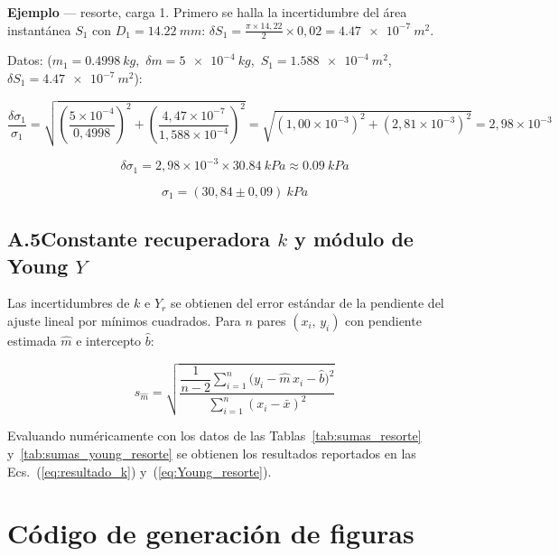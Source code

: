 \begin{appendices}
\textbf{Ejemplo} — resorte, carga 1. 
Primero se halla la incertidumbre del área instantánea $S_1$ con $D_1 = \qty{14,22}{mm}$:
$\delta S_1 = \frac{\pi \times 14{,}22}{2} \times 0{,}02 = \qty{4,47e-7}{m^2}$.

Datos: ($m_1 = \qty{0,4998}{kg}$,\ $\delta m = \qty{5e-4}{kg}$,\
$S_1 = \qty{1,588e-4}{m^2}$,\ $\delta S_1 = \qty{4,47e-7}{m^2}$):

\[
    \frac{\delta\sigma_{1}}{\sigma_{1}}
    = \sqrt{
        \left(\frac{5\times10^{-4}}{0{,}4998}\right)^{\!2}
        +
        \left(\frac{4{,}47\times10^{-7}}{1{,}588\times10^{-4}}\right)^{\!2}
      }
    = \sqrt{(1{,}00\times10^{-3})^2 + (2{,}81\times10^{-3})^2}
    = 2{,}98\times10^{-3}
\]

\[
    \delta\sigma_{1}
    = 2{,}98\times10^{-3} \times \qty{30,84}{kPa}
    \approx \qty{0,09}{kPa}
\]

\[
    \boxed{\sigma_{1} = (30{,}84 \pm 0{,}09)\ \unit{kPa}}
\]

\subsection*{A.5\quad Constante recuperadora \texorpdfstring{$k$}{k}
             y módulo de Young \texorpdfstring{$Y$}{Y}}

Las incertidumbres de $k$ e $Y_r$ se obtienen del error estándar de la
pendiente del ajuste lineal por mínimos cuadrados.
Para $n$ pares $(x_i,\,y_i)$ con pendiente estimada $\hat{m}$ e
intercepto $\hat{b}$:

\begin{equation}
    s_{\hat{m}}
    = \sqrt{
        \dfrac{
            \dfrac{1}{n-2}\displaystyle\sum_{i=1}^{n}
            \bigl(y_i - \hat{m}\,x_i - \hat{b}\bigr)^2
        }{
            \displaystyle\sum_{i=1}^{n}(x_i - \bar{x})^2
        }
      }
    \label{eq:inc_pendiente}
\end{equation}

Evaluando numéricamente con los datos de las
Tablas~\ref{tab:sumas_resorte} y~\ref{tab:sumas_young_resorte}
se obtienen los resultados reportados en las
Ecs.~(\ref{eq:resultado_k}) y~(\ref{eq:Young_resorte}).

\section{Código de generación de figuras}


\end{appendices}
